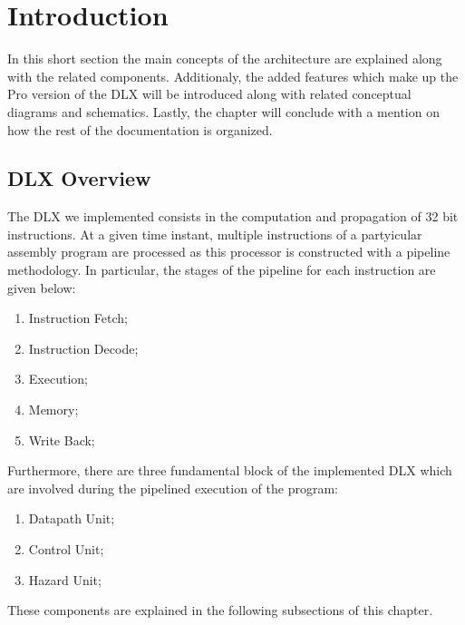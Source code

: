 %
\chapter{Introduction}
\label{Introduction}


    \indent In this short section the main concepts of the architecture are explained along with the related components.
    Additionaly, the added features which make up the Pro version of the DLX will be introduced along with related conceptual diagrams and schematics. 
    Lastly, the chapter will conclude with a mention on how the rest of the documentation is organized. 

\section{DLX Overview}
    The DLX we implemented consists in the computation and propagation of 32 bit instructions. 
    At a given time instant, multiple instructions of a partyicular assembly program are processed as this processor is constructed with a pipeline methodology.
    In particular, the stages of the pipeline for each instruction are given below:
    \begin{enumerate}
        \item Instruction Fetch;
        \item Instruction Decode;
        \item Execution;
        \item Memory;
        \item Write Back;
        \end{enumerate}
	\indent Furthermore, there are three fundamental block of the implemented DLX which are involved during the pipelined execution of the program:
	\begin{enumerate}
        \item Datapath Unit;
        \item Control Unit;
        \item Hazard Unit;
        \end{enumerate}
		These components are explained in the following subsections of this chapter.
